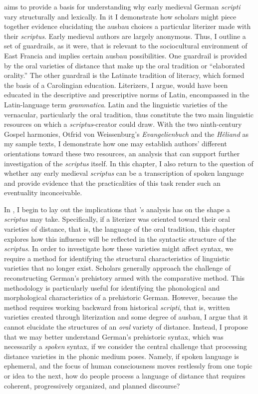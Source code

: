  aims to provide a basis for understanding why early medieval German \textit{scripti} vary structurally and lexically. In it I demonstrate how scholars might piece together evidence elucidating the ausbau choices a particular literizer made with their \textit{scriptus}. Early medieval authors are largely anonymous. Thus, I outline a set of guardrails, as it were, that is relevant to the sociocultural environment of East Francia and implies certain ausbau possibilities. One guardrail is provided by the oral varieties of distance that make up the oral tradition or “elaborated orality.” The other guardrail is the Latinate tradition of literacy, which formed the basis of a Carolingian education. Literizers, I argue, would have been educated in the descriptive and prescriptive norms of Latin, encompassed in the Latin-language term \textit{grammatica}. Latin and the linguistic varieties of the vernacular, particularly the oral tradition, thus constitute the two main linguistic resources on which a \textit{scriptus}{}-creator could draw. With the two ninth-century Gospel harmonies, Otfrid von Weissenburg’s \textit{Evangelienbuch} and the \textit{Hêliand} as my sample texts, I demonstrate how one may establish authors’ different orientations toward these two resources, an analysis that can support further investigation of the \textit{scriptus} itself. In this chapter, I also return to the question of whether any early medieval \textit{scriptus} can be a transcription of spoken language and provide evidence that the practicalities of this task render such an eventuality inconceivable.

In , I begin to lay out the implications that ’s analysis has on the shape a \textit{scriptus} may take. Specifically, if a literizer was oriented toward their oral varieties of distance, that is, the language of the oral tradition, this chapter explores how this influence will be reflected in the syntactic structure of the \textit{scriptus}. In order to investigate how these varieties might affect syntax, we require a method for identifying the structural characteristics of linguistic varieties that no longer exist. Scholars generally approach the challenge of reconstructing German’s prehistory armed with the comparative method. This methodology is particularly useful for identifying the phonological and morphological characteristics of a prehistoric German. However, because the method requires working backward from historical \textit{scripti}, that is, written varieties created through literization and some degree of ausbau, I argue that it cannot elucidate the structures of an \textit{oral} variety of distance. Instead, I propose that we may better understand German’s prehistoric syntax, which was necessarily a \textit{spoken} syntax, if we consider the central challenge that processing distance varieties in the phonic medium poses. Namely, if spoken language is ephemeral, and the focus of human consciousness moves restlessly from one topic or idea to the next, how do people process a language of distance that requires coherent, progressively organized, and planned discourse?

